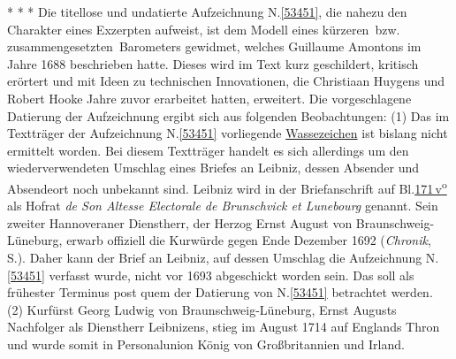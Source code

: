 \vspace{5.5em}%
\pstart%
\noindent%
\centering%
*     *     *
\pend%
\newpage%
%
\frenchspacing%
\footnotesize%
\pstart%
\noindent%
%
Die titellose und undatierte Aufzeichnung N.\;\ref{53451}, die nahezu den Charakter eines Exzerpten aufweist, ist dem Modell eines \glqq kürzeren\grqq\ bzw. \glqq zusammengesetzten\grqq\ Barometers gewidmet, welches Guillaume Amontons im Jahre 1688 beschrieben hatte.
Dieses wird im Text kurz geschildert, kritisch erörtert und mit Ideen zu technischen Innovationen, die Christiaan Huygens und Robert Hooke Jahre zuvor erarbeitet hatten, erweitert.
Die vorgeschlagene Datierung der Aufzeichnung ergibt sich aus folgenden Beobachtungen:
\pend%
\pstart%
(1)
Das im Textträger der Aufzeichnung N.\;\ref{53451} vorliegende \href{\Scan{LH_37_04_171wz}}{Wassezeichen} ist bislang nicht ermittelt worden.
Bei diesem Textträger handelt es sich allerdings um den wiederverwendeten Umschlag eines Briefes an Leibniz, dessen Absender und Absendeort noch unbekannt sind.
Leibniz wird in der Briefanschrift auf Bl.\;\href{\Scan{LH_37_04_171v}}{171\,v\textsuperscript{o}} als Hofrat \textit{de Son Altesse Electorale de Brunschvick et Lunebourg} genannt.
Sein zweiter Hannoveraner Dienstherr, der Herzog Ernst August von Braunschweig-Lüneburg, erwarb offiziell die Kurwürde gegen Ende Dezember 1692 (\textit{Chronik}, S.).\cite{01236}
Daher kann der Brief an Leibniz, auf dessen Umschlag die Aufzeichnung N.\;\ref{53451} verfasst wurde, nicht vor 1693 abgeschickt worden sein.
Das soll als frühester Terminus post quem der Datierung von N.\;\ref{53451} betrachtet werden.
\pend%
\pstart%
(2)
Kurfürst Georg Ludwig von Braunschweig-Lüneburg, Ernst Augusts Nachfolger als Dienstherr Leibnizens, stieg im August 1714 auf Englands Thron und wurde somit in Personalunion König von Großbritannien und Irland.
